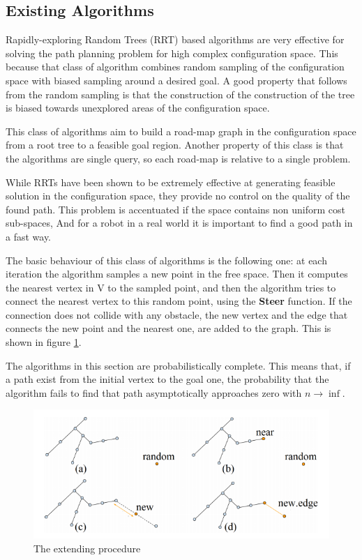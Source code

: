 \documentclass[10pt]{article}
\begin{document}
	\subsection{Existing Algorithms}

	Rapidly-exploring Random Trees (RRT) based algorithms are very effective for solving the path planning problem for high complex configuration space. This because that class of algorithm combines random sampling of the configuration space with biased sampling around a desired goal. A good property that follows from the random sampling is that the construction of the construction of the tree is biased towards unexplored areas of the configuration space.
	
	This class of algorithms aim to build a road-map graph in the configuration space from a root tree to a feasible goal region. Another property of this class is that the algorithms are single query, so each road-map is relative to a single problem. 
	
	While RRTs have been shown to be extremely effective at generating feasible solution in the configuration space, they provide no control on the quality of the found path. This problem is accentuated if the space contains non uniform cost sub-spaces, And for a robot in a real world it is important to find a good path in a fast way.
	
	The basic behaviour of this class of algorithms is the following one: at each iteration the algorithm samples a new point in the free space. Then it computes the nearest vertex in V to the sampled point, and then the algorithm tries to connect the nearest vertex to this random point, using the \textbf{Steer} function. If the connection does not collide with any obstacle, the new vertex and the edge that connects the new point and the nearest one, are added to the graph. This is shown in figure \ref{fig:extension}.
	
		
	The algorithms in this section are probabilistically complete. This means that, if a path exist from the initial vertex to the goal one, the probability that the algorithm fails to find that path asymptotically approaches zero with $n \rightarrow \inf$. 
	
	
	\FloatBarrier
	\begin{figure}[bht]
		\centering
		\includegraphics[width=0.8\linewidth]{rrtExt.png}
		\caption{The extending procedure}
		\label{fig:extension}
	\end{figure}
\FloatBarrier
\end{document}
